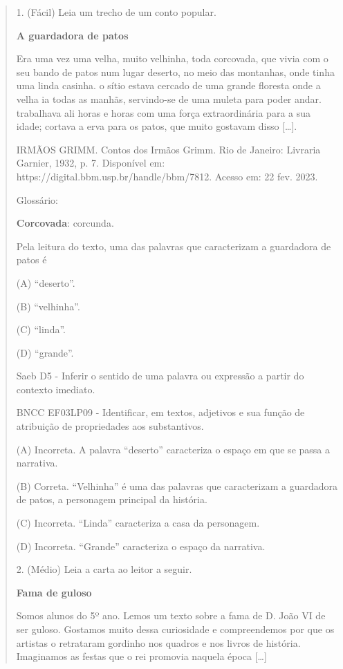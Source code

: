 \begin{quote}
1. (Fácil) Leia um trecho de um conto popular.

\textbf{A guardadora de patos}

Era uma vez uma velha, muito velhinha, toda corcovada, que vivia com o
seu bando de patos num lugar deserto, no meio das montanhas, onde tinha
uma linda casinha. o sítio estava cercado de uma grande floresta onde a
velha ia todas as manhãs, servindo-se de uma muleta para poder andar.
trabalhava ali horas e horas com uma força extraordinária para a sua
idade; cortava a erva para os patos, que muito gostavam disso
{[}\ldots{}{]}.

IRMÃOS GRIMM. Contos dos Irmãos Grimm. Rio de Janeiro: Livraria Garnier,
1932, p. 7. Disponível em: https://digital.bbm.usp.br/handle/bbm/7812.
Acesso em: 22 fev. 2023.

Glossário:

\textbf{Corcovada}: corcunda.

Pela leitura do texto, uma das palavras que caracterizam a guardadora de
patos é

(A) ``deserto''.

(B) ``velhinha''.

(C) ``linda''.

(D) ``grande''.

Saeb D5 - Inferir o sentido de uma palavra ou expressão a partir do
contexto imediato.

BNCC EF03LP09 - Identificar, em textos, adjetivos e sua função de
atribuição de propriedades aos substantivos.

(A) Incorreta. A palavra ``deserto'' caracteriza o espaço em que se
passa a narrativa.

(B) Correta. ``Velhinha'' é uma das palavras que caracterizam a
guardadora de patos, a personagem principal da história.

(C) Incorreta. ``Linda'' caracteriza a casa da personagem.

(D) Incorreta. ``Grande'' caracteriza o espaço da narrativa.

2. (Médio) Leia a carta ao leitor a seguir.

\textbf{Fama de guloso}

Somos alunos do 5º ano. Lemos um texto sobre a fama de D. João VI de ser
guloso. Gostamos muito dessa curiosidade e compreendemos por que os
artistas o retrataram gordinho nos quadros e nos livros de história.
Imaginamos as festas que o rei promovia naquela época {[}\ldots{}{]}


\end{quote}
